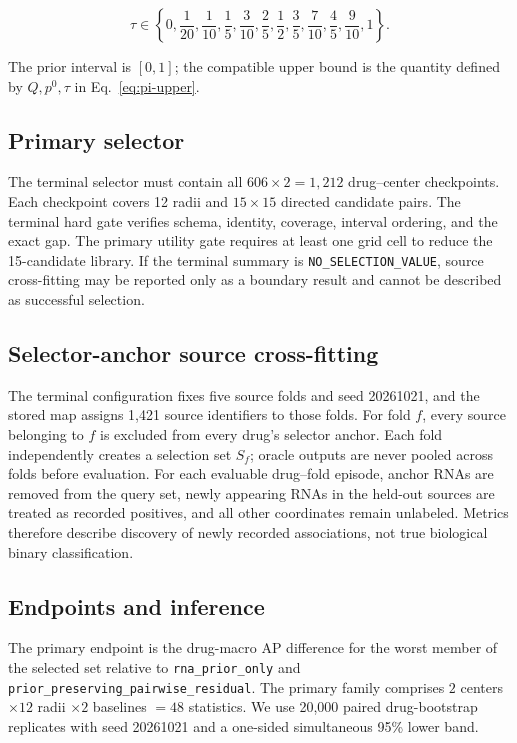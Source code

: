 \documentclass[preprint,review,12pt]{elsarticle}
\begin{document}
\begin{equation}
\tau\in\left\{0,\frac1{20},\frac1{10},\frac15,\frac3{10},\frac25,
\frac12,\frac35,\frac7{10},\frac45,\frac9{10},1\right\}.
\end{equation}

The prior interval is \([0,1]\); the compatible upper bound is the quantity
defined by \(Q,p^0,\tau\) in Eq.~\eqref{eq:pi-upper}.

\subsection{Primary selector}

The terminal selector must contain all \(606\times2=1{,}212\) drug--center
checkpoints. Each checkpoint covers 12 radii and \(15\times15\) directed
candidate pairs. The terminal hard gate verifies schema, identity, coverage,
interval ordering, and the exact gap. The primary utility gate requires at least one
grid cell to reduce the 15-candidate library. If the terminal summary is
\texttt{NO\_SELECTION\_VALUE}, source cross-fitting may be reported only as a
boundary result and cannot be described as successful selection.

\subsection{Selector-anchor source cross-fitting}

The terminal configuration fixes five source folds and seed 20261021, and the
stored map assigns 1,421 source identifiers to those folds. For fold \(f\),
every source belonging to \(f\) is excluded
from every drug's selector anchor. Each fold independently creates a selection
set \(S_f\); oracle outputs are never pooled across folds before evaluation.
For each evaluable drug--fold episode, anchor RNAs are removed from the query
set, newly appearing RNAs in the held-out sources are treated as recorded
positives, and all other coordinates remain unlabeled. Metrics therefore
describe discovery of newly recorded associations, not true biological binary
classification.

\subsection{Endpoints and inference}

The primary endpoint is the drug-macro AP difference for the worst member of
the selected set relative to \nolinkurl{rna_prior_only} and
\nolinkurl{prior_preserving_pairwise_residual}. The primary family comprises
\(2\) centers \(\times12\) radii \(\times2\) baselines \(=48\) statistics. We use
20,000 paired drug-bootstrap replicates with seed 20261021 and a one-sided
simultaneous 95\% lower band.
\end{document}
